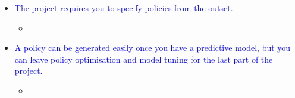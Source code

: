 \documentclass[a4paper, 12pt]{extarticle}
\begin{document}
\begin{itemize}
\begin{itemize}
        \end{itemize}
    \item \textcolor{blue}{The project requires you to specify policies from the outset.}
        \begin{itemize}
            \item 
        \end{itemize}
    \item \textcolor{blue}{A policy can be generated easily once you have a predictive model, but you can leave policy optimisation and model tuning for the last part of the project.}
        \begin{itemize}
            \item 
        \end{itemize}
\end{itemize}


\newpage
\end{document}
